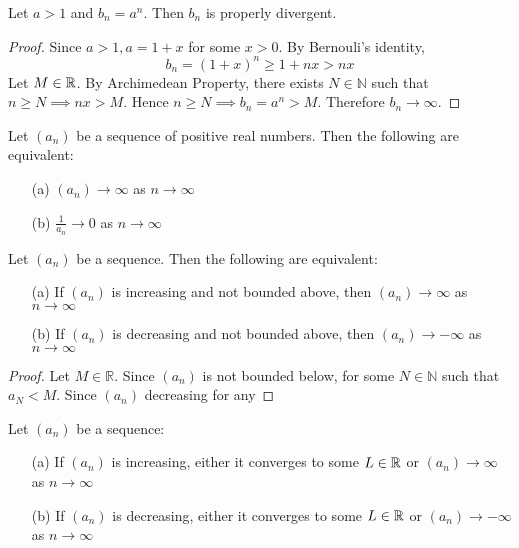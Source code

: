 \documentclass[11pt]{article}
\begin{document}
\begin{example}
	Let \(a > 1\) and \(b_n = a^n\). Then \(b_n\) is properly divergent.
\end{example}
\begin{proof}
	Since \(a > 1, a = 1 +x \) for some \(x > 0\). By Bernouli's identity,
	\[ b_n = ( 1 + x)^n \geq 1 + nx > nx\]
	Let \(M \in \mathbb R\). By Archimedean Property, there exists \(N \in \mathbb{N}\) such that \(n \geq N \implies nx > M\). Hence \(n \geq N \implies b_n = a^n > M\). Therefore \(b_n \to \infty\).
\end{proof}

\begin{theorem}
	Let \((a_n)\) be a sequence of positive real numbers. Then the following are equivalent:
	\begin{itemize}
		\item[(a)] \((a_n) \to \infty\) as \( n \to \infty\)
		\item[(b)] \(\frac{1}{a_n} \to 0\) as \( n \to \infty\)
	\end{itemize}
\end{theorem}
\begin{theorem}
	Let \((a_n)\) be a sequence. Then the following are equivalent:
	\begin{itemize}
		\item[(a)] If \((a_n)\) is increasing and not bounded above, then \((a_n) \to \infty\) as \( n \to \infty\)
		\item[(b)]  If \((a_n)\) is decreasing and not bounded above, then \((a_n) \to -\infty\) as \( n \to \infty\)
	\end{itemize}
\end{theorem}
\begin{proof}
	Let \(M \in \mathbb{R}\). Since \((a_n)\) is not bounded below, for some \(N \in \mathbb{N}\) such that \(a_N < M\). Since \((a_n)\) decreasing for any
\end{proof}
\begin{corollary}
	Let \((a_n)\) be a sequence:
	\begin{itemize}
		\item[(a)] If \((a_n)\) is increasing, either it converges to some \(L \in \mathbb R\) or \((a_n) \to \infty\) as \( n \to \infty\)
		\item[(b)] If \((a_n)\) is decreasing, either it converges to some \(L \in \mathbb R\) or \((a_n) \to -\infty\) as \( n \to \infty\)
	\end{itemize}
\end{corollary}
\end{document}
